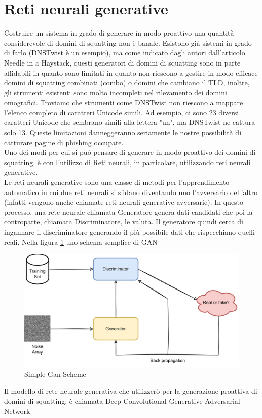 \section{Reti neurali generative}
Costruire un sistema in grado di generare in modo proattivo una quantità considerevole di domini di squatting non è banale. Esistono già sistemi in grado di farlo (DNSTwist è un esempio), ma come indicato dagli autori dall'articolo Needle in a Haystack\cite{10.1145/3278532.3278569}, questi generatori di domini di squatting sono in parte affidabili in quanto sono limitati in quanto non riescono a gestire in modo efficace domini di squatting combinati (combo) o domini che cambiano il TLD, inoltre, gli strumenti esistenti sono molto incompleti nel rilevamento dei domini omografici. Troviamo che strumenti come DNSTwist non riescono a mappare l'elenco completo di caratteri Unicode simili. Ad esempio, ci sono 23 diversi caratteri Unicode che sembrano simili alla lettera "un", ma DNSTwist ne cattura solo 13. Queste limitazioni danneggeranno seriamente le nostre possibilità di catturare pagine di phishing occupate.\\
Uno dei modi per cui si può pensare di generare in modo proattivo dei domini di squatting, è con l'utilizzo di Reti neurali, in particolare, utilizzando reti neurali generative.\\
Le reti neurali generative sono una classe di metodi per l'apprendimento automatico in cui due reti neurali si sfidano diventando uno l'avversario dell'altro (infatti vengono anche chiamate reti neurali generative avversarie). In questo processo, una rete neurale chiamata Generatore genera dati candidati che poi la controparte, chiamata Discriminatore, le valuta. Il generatore quindi cerca di ingannare il discriminatore generando il più possibile dati che rispecchiano quelli reali. Nella figura \ref{fig:gan1} uno schema semplice di GAN\\
\begin{figure}[!h]
  \centering
  \begin{minipage}[b]{\textwidth}
    \includegraphics[width=\textwidth]{pictures/gan.png}
    \caption{Simple Gan Scheme}
    \label{fig:gan1}
  \end{minipage}
  \hfill
\end{figure}
Il modello di rete neurale generativa che utilizzerò per la generazione proattiva di domini di squatting, è chiamata Deep Convolutional Generative Adversarial Network

